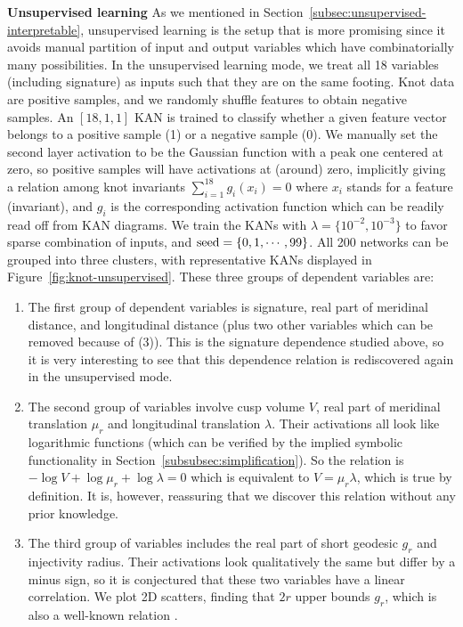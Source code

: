 \documentclass{article}
\numberwithin{equation}{section}
\numberwithin{figure}{section}
\begin{document}
{\bf Unsupervised learning} As we mentioned in Section~\ref{subsec:unsupervised-interpretable}, unsupervised learning is the setup that is more promising since it avoids manual partition of input and output variables which have combinatorially many possibilities. In the unsupervised learning mode, we treat all 18 variables (including signature) as inputs such that they are on the same footing. Knot data are positive samples, and we randomly shuffle features to obtain negative samples. 
An $[18,1,1]$ KAN is trained to classify whether a given feature vector belongs to a positive sample (1) or a negative sample (0). We manually set the second layer activation to be the Gaussian function with a peak one centered at zero, so positive samples will have activations at (around) zero, implicitly giving a relation among knot invariants $\sum_{i=1}^{18} g_i(x_i)=0$ where $x_i$ stands for a feature (invariant), and $g_i$ is the corresponding activation function which can be readily read off from KAN diagrams. We train the KANs with $\lambda=\{10^{-2},10^{-3}\}$ to favor sparse combination of inputs, and ${\rm seed}=\{0,1,\cdots,99\}$. All 200 networks can be grouped into three clusters, with representative KANs displayed in Figure~\ref{fig:knot-unsupervised}. These three groups of dependent variables are: 
\begin{enumerate}[(1)]
    \item The first group of dependent variables is signature, real part of meridinal distance, and longitudinal distance (plus two other variables which can be removed because of (3)). This is the signature dependence studied above, so it is very interesting to see that this dependence relation is rediscovered again in the unsupervised mode. 
    \item  The second group of variables involve cusp volume $V$, real part of meridinal translation $\mu_r$ and longitudinal translation $\lambda$. Their activations all look like logarithmic functions (which can be verified by the implied symbolic functionality in Section~\ref{subsubsec:simplification}). So the relation is $-\log V+\log \mu_r+\log \lambda=0$ which is equivalent to $V=\mu_r\lambda$, which is true by definition. It is, however, reassuring that we discover this relation without any prior knowledge.
    \item The third group of variables includes the real part of short geodesic $g_r$ and injectivity radius. Their activations look qualitatively the same but differ by a minus sign, so it is conjectured that these two variables have a linear correlation. We plot 2D scatters, finding that $2r$ upper bounds $g_r$, which is also a well-known relation \cite{petersen2006riemannian}. 
\end{enumerate}
\end{document}
